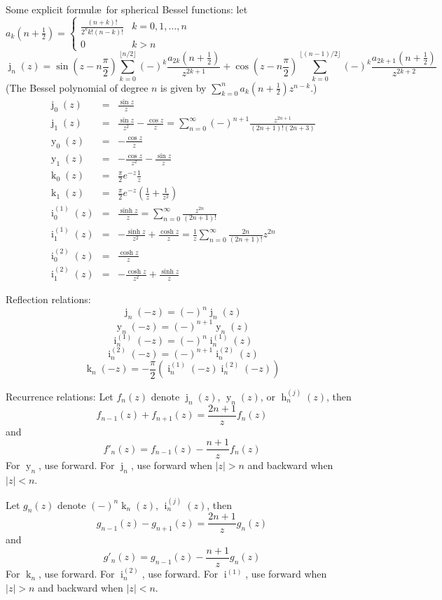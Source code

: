 \documentclass[10pt,dvipdfmx,letterpaper,twoside]{article}
\let\O=\operatorname
\begin{document}
Some explicit formul\ae\ for spherical Bessel functions:
let $a_k(n+\tfrac12) = \begin{cases}\frac{(n+k)!}{2^k k! (n-k)!} & k=0,1,\dots,n\\0&k>n\end{cases}$
\[ \O{j}_n(z) = \sin(z - n\frac\pi2)\sum_{k=0}^{\lfloor n/2\rfloor}(-)^k\frac{a_{2k}(n+\tfrac12)}{z^{2k+1}}
    + \cos(z - n\frac\pi2)\sum_{k=0}^{\lfloor (n-1)/2\rfloor}(-)^k\frac{a_{2k+1}(n+\tfrac12)}{z^{2k+2}} \]
(The Bessel polynomial of degree $n$ is given by $\sum_{k=0}^n a_k(n+\tfrac12)z^{n-k}$.)
\begin{eqnarray*}
\O{j}_0(z) &=& \frac{\sin z}{z} \\
\O{j}_1(z) &=& \frac{\sin z}{z^2} - \frac{\cos z}{z} = \sum_{n=0}^\infty (-)^{n+1}\frac{z^{2n+1}}{(2n+1)!(2n+3)} \\
\O{y}_0(z) &=& -\frac{\cos z}{z} \\
\O{y}_1(z) &=& -\frac{\cos z}{z^2} - \frac{\sin z}{z} \\
\O{k}_0(z) &=& \frac{\pi}{2} e^{-z} \frac{1}{z} \\
\O{k}_1(z) &=& \frac{\pi}{2} e^{-z} \left( \frac{1}{z} + \frac{1}{z^2} \right) \\
\O{i}^{(1)}_0(z) &=& \frac{\sinh z}{z} = \sum_{n=0}^\infty\frac{z^{2n}}{(2n+1)!} \\
\O{i}^{(1)}_1(z) &=& -\frac{\sinh z}{z^2} + \frac{\cosh z}{z} = \frac{1}{z}\sum_{n=0}^\infty\frac{2n}{(2n+1)!}z^{2n} \\
\O{i}^{(2)}_0(z) &=& \frac{\cosh z}{z} \\
\O{i}^{(2)}_1(z) &=& -\frac{\cosh z}{z^2} + \frac{\sinh z}{z}
\end{eqnarray*}

Reflection relations:
\[ \O{j}_n(-z) = (-)^n\O{j}_n(z) \]
\[ \O{y}_n(-z) = (-)^{n+1}\O{y}_n(z) \]
\[ \O{i}^{(1)}_n(-z) = (-)^n\O{i}^{(1)}_n(z) \]
\[ \O{i}^{(2)}_n(-z) = (-)^{n+1}\O{i}^{(2)}_n(z) \]
\[ \O{k}_n(-z) = -\frac{\pi}{2}\left( \O{i}^{(1)}_n(-z) \O{i}^{(2)}_n(-z) \right) \]

Recurrence relations:
Let $f_n(z)$ denote $\O{j}_n(z)$, $\O{y}_n(z)$, or $\O{h}^{(j)}_n(z)$, then
\[ f_{n-1}(z) + f_{n+1}(z) = \frac{2n+1}{z} f_n(z) \]
and
\[ f'_n(z) = f_{n-1}(z) - \frac{n+1}{z} f_n(z) \]
For $\O{y}_n$, use forward.  For $\O{j}_n$, use forward when $|z|>n$ and backward when $|z|<n$.

Let $g_n(z)$ denote $(-)^n\O{k}_n(z)$, $\O{i}^{(j)}_n(z)$, then
\[ g_{n-1}(z) - g_{n+1}(z) = \frac{2n+1}{z} g_n(z) \]
and
\[ g'_n(z) = g_{n-1}(z) - \frac{n+1}{z} g_n(z) \]
For $\O{k}_n$, use forward.  For $\O{i}^{(2)}_n$, use forward.  For $\O{i}^{(1)}$, use forward when $|z|>n$ and backward when $|z|<n$.
\end{document}
